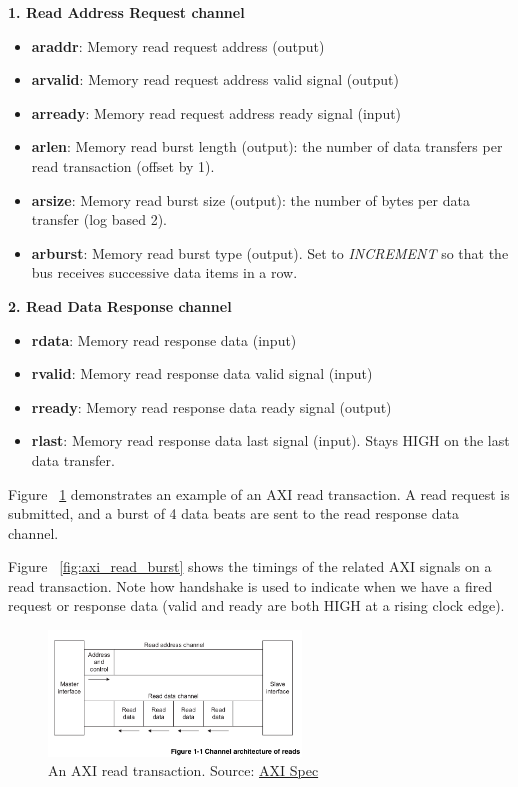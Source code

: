 \documentclass[11pt]{article}
\begin{document}
\textbf{1. Read Address Request channel}
\begin{itemize}
\item \textbf{araddr}: Memory read request address (output)
\item \textbf{arvalid}: Memory read request address valid signal (output)
\item \textbf{arready}: Memory read request address ready signal (input)
\item \textbf{arlen}: Memory read burst length (output): the number of data transfers per read transaction (offset by 1).
\item \textbf{arsize}: Memory read burst size (output): the number of bytes per data transfer (log based 2).
\item \textbf{arburst}: Memory read burst type (output). Set to \textit{INCREMENT} so that the bus receives successive data items in a row.
\end{itemize}

\textbf{2. Read Data Response channel}
\begin{itemize}
\item \textbf{rdata}: Memory read response data (input)
\item \textbf{rvalid}: Memory read response data valid signal (input)
\item \textbf{rready}: Memory read response data ready signal (output)
\item \textbf{rlast}: Memory read response data last signal (input). Stays HIGH on the last data transfer.
\end{itemize}

Figure ~\ref{fig:axi_read} demonstrates an example of an AXI read transaction.
A read request is submitted, and a burst of 4 data beats are sent to the read response data channel.

Figure ~\ref{fig:axi_read_burst} shows the timings of the related AXI signals on a read transaction. Note how handshake is used to indicate when we have a fired request or response data (valid and ready are both HIGH at a rising clock edge).

\begin{figure}[hbt]
\begin{center}
  \includegraphics[width=0.6\textwidth]{axi_read.png}
  \caption{An AXI read transaction. Source: \href{https://developer.arm.com/documentation/ihi0022/b}{AXI Spec}}
  \label{fig:axi_read}
\end{center}
\end{figure}
\end{document}

